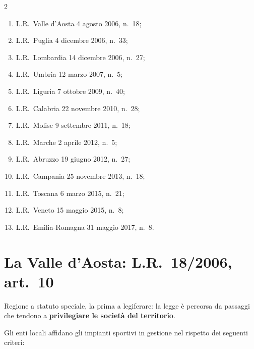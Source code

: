 \begin{multicols}{2}
\begin{enumerate}
  \item L.R.\ Valle d'Aosta 4 agosto 2006, n.\ 18;
  \item L.R.\ Puglia 4 dicembre 2006, n.\ 33;
  \item L.R.\ Lombardia 14 dicembre 2006, n.\ 27;
  \item L.R.\ Umbria 12 marzo 2007, n.\ 5;
  \item L.R.\ Liguria 7 ottobre 2009, n.\ 40;
  \item L.R.\ Calabria 22 novembre 2010, n.\ 28;
  \item L.R.\ Molise 9 settembre 2011, n.\ 18;
  \item L.R.\ Marche 2 aprile 2012, n.\ 5;
  \item L.R.\ Abruzzo 19 giugno 2012, n.\ 27;
  \item L.R.\ Campania 25 novembre 2013, n.\ 18;
  \item L.R.\ Toscana 6 marzo 2015, n.\ 21;
  \item L.R.\ Veneto 15 maggio 2015, n.\ 8;
  \item L.R.\ Emilia-Romagna 31 maggio 2017, n.\ 8.
\end{enumerate}
\end{multicols}


\section{La Valle d'Aosta: L.R.\ 18/2006, art.\ 10}

Regione a statuto speciale, la prima a legiferare: la legge è percorsa da passaggi che tendono a
\textbf{privilegiare le società del territorio}.


Gli enti locali affidano gli impianti sportivi in gestione nel rispetto dei seguenti criteri:

